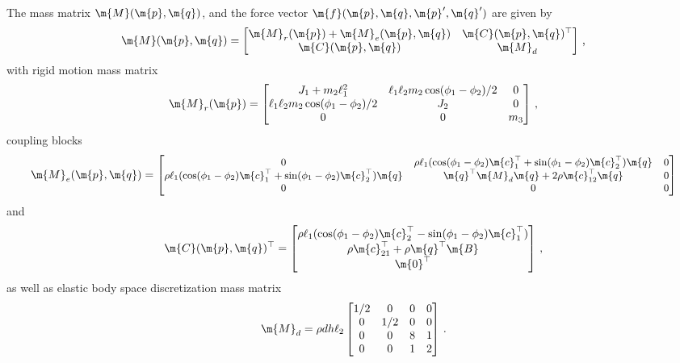 %
The mass matrix $\m{M}(\m{p}, \m{q})$, and the force vector $\m{f}(\m{p}, \m{q}, \m{p}^\prime, \m{q}^\prime)$ are given by
%
\begin{equation}
  \m{M}(\m{p}, \m{q}) = \begin{bmatrix}
    \m{M}_r(\m{p}) + \m{M}_e(\m{p}, \m{q}) & \m{C}(\m{p}, \m{q})^\top \\
    \m{C}(\m{p}, \m{q})                    & \m{M}_{d}
  \end{bmatrix} \, \text{,}
\end{equation}
%
with rigid motion mass matrix
%
\begin{equation*}
  \m{M}_r(\m{p}) = \begin{bmatrix}
    J_1+m_2 \ell_1^2 & \ell_1 \ell_2 m_2 \cos(\phi_1 - \phi_2)/2 & 0 \\
    \ell_1 \ell_2 m_2 \cos(\phi_1 - \phi_2)/2 & J_2 & 0 \\
    0 & 0 & m_3
  \end{bmatrix} \, \text{,}
\end{equation*}
%
coupling blocks
%
\begin{equation*}
  \m{M}_e(\m{p}, \m{q}) = \small{\begin{bmatrix}
    0 & \rho \ell_1(\cos(\phi_1 - \phi_2)\m{c}_1^\top + \sin(\phi_1 - \phi_2)\m{c}_2^\top) \m{q} & 0 \\
    \rho \ell_1(\cos(\phi_1 - \phi_2)\m{c}_1^\top + \sin(\phi_1 - \phi_2)\m{c}_2^\top) \m{q} & \m{q}^\top\m{M}_{d}\m{q} + 2\rho\m{c}_{12}^\top\m{q} & 0 \\
    0 & 0 & 0
  \end{bmatrix}}
\end{equation*}
%
and
%
\begin{equation*}
  \m{C}(\m{p}, \m{q})^\top = \begin{bmatrix}
    \rho \ell_1(\cos(\phi_1 - \phi_2)\m{c}_2^\top - \sin(\phi_1 - \phi_2)\m{c}_1^\top) \\
    \rho\m{c}_{21}^\top + \rho\m{q}^\top\m{B} \\
    \m{0}^\top
  \end{bmatrix} \, \text{,}
\end{equation*}
%
as well as elastic body space discretization mass matrix
%
\begin{equation*}
  \m{M}_{d} = \rho d h \ell_2 \begin{bmatrix}
    1/2 & 0   & 0 & 0 \\
    0   & 1/2 & 0 & 0 \\
    0   & 0   & 8 & 1 \\
    0   & 0   & 1 & 2
  \end{bmatrix} \, \text{.}
\end{equation*}

